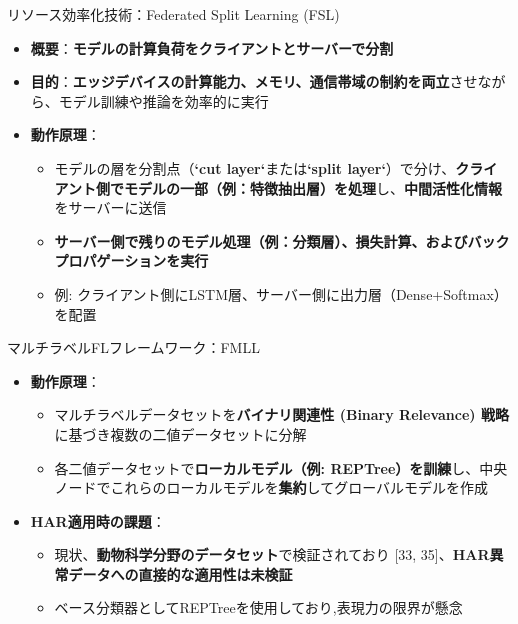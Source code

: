 \documentclass[unicode,12pt,aspectratio=169,dvipdfmx]{beamer}
\begin{document}
\begin{frame}{リソース効率化技術：Federated Split Learning (FSL)}
\begin{itemize}
    \item \textbf{概要}：\textbf{モデルの計算負荷をクライアントとサーバーで分割}
    \item \textbf{目的}：\textbf{エッジデバイスの計算能力、メモリ、通信帯域の制約を両立}させながら、モデル訓練や推論を効率的に実行
    \item \textbf{動作原理}：
    \begin{itemize}
        \item モデルの層を分割点（\textbf{`cut layer`}または\textbf{`split layer`}）で分け、\textbf{クライアント側でモデルの一部（例：特徴抽出層）を処理}し、\textbf{中間活性化情報}をサーバーに送信
        \item \textbf{サーバー側で残りのモデル処理（例：分類層）、損失計算、およびバックプロパゲーションを実行}
        \item 例: クライアント側にLSTM層、サーバー側に出力層（Dense+Softmax）を配置
    \end{itemize}
\end{itemize}
\end{frame}

\begin{frame}{マルチラベルFLフレームワーク：FMLL}
\begin{itemize}
    \item \textbf{動作原理}：
    \begin{itemize}
        \item マルチラベルデータセットを\textbf{バイナリ関連性 (Binary Relevance) 戦略}に基づき複数の二値データセットに分解
        \item 各二値データセットで\textbf{ローカルモデル（例: REPTree）を訓練}し、中央ノードでこれらのローカルモデルを\textbf{集約}してグローバルモデルを作成
    \end{itemize}
    \item \textbf{HAR適用時の課題}：
    \begin{itemize}
        \item 現状、\textbf{動物科学分野のデータセット}で検証されており [33, 35]、\textbf{HAR異常データへの直接的な適用性は未検証}
        \item ベース分類器としてREPTreeを使用しており,表現力の限界が懸念
    \end{itemize}
\end{itemize}
\end{frame}
\end{document}
